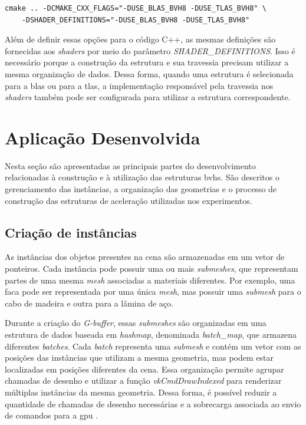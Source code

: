\begin{verbatim}
cmake .. -DCMAKE_CXX_FLAGS="-DUSE_BLAS_BVH8 -DUSE_TLAS_BVH8" \
    -DSHADER_DEFINITIONS="-DUSE_BLAS_BVH8 -DUSE_TLAS_BVH8"
\end{verbatim}

Além de definir essas opções para o código C++, as mesmas definições são fornecidas aos \textit{shaders} por meio do parâmetro \textit{SHADER\_DEFINITIONS}. Isso é necessário porque a construção da estrutura e sua travessia precisam utilizar a mesma organização de dados. Dessa forma, quando uma estrutura é selecionada para a \gls{blas} ou para a \gls{tlas}, a implementação responsável pela travessia nos \textit{shaders} também pode ser configurada para utilizar a estrutura correspondente.

\section{Aplicação Desenvolvida}

Nesta seção são apresentadas as principais partes do desenvolvimento relacionadas à construção e à utilização das estruturas \glspl{bvh}. São descritos o gerenciamento das instâncias, a organização das geometrias e o processo de construção das estruturas de aceleração utilizadas nos experimentos.

\subsection{Criação de instâncias}

As instâncias dos objetos presentes na cena são armazenadas em um vetor de ponteiros. Cada instância pode possuir uma ou mais \textit{submeshes}, que representam partes de uma mesma \textit{mesh} associadas a materiais diferentes. Por exemplo, uma faca pode ser representada por uma única \textit{mesh}, mas possuir uma \textit{submesh} para o cabo de madeira e outra para a lâmina de aço.

Durante a criação do \textit{G-buffer}, essas \textit{submeshes} são organizadas em uma estrutura de dados baseada em \textit{hashmap}, denominada \textit{batch\_map}, que armazena diferentes \textit{batches}. Cada \textit{batch} representa uma \textit{submesh} e contém um vetor com as posições das instâncias que utilizam a mesma geometria, mas podem estar localizadas em posições diferentes da cena. Essa organização permite agrupar chamadas de desenho e utilizar a função \textit{vkCmdDrawIndexed} para renderizar múltiplas instâncias da mesma geometria. Dessa forma, é possível reduzir a quantidade de chamadas de desenho necessárias e a sobrecarga associada ao envio de comandos para a \gls{gpu} \cite{vulkan_vk_cmd_draw_indexed}.

